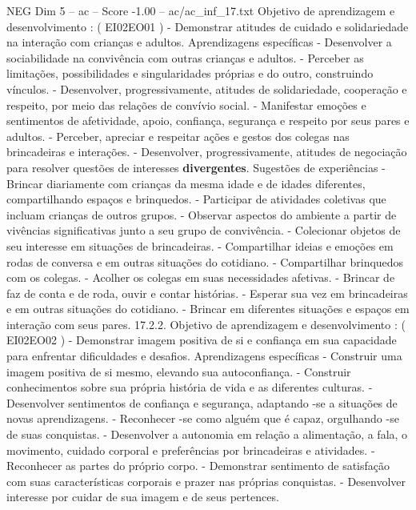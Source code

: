 \begin{textsample}{NEG Dim 5 – ac – Score -1.00 – ac/ac\_inf\_17.txt}
Objetivo de aprendizagem e desenvolvimento : ( EI02EO01 ) - Demonstrar atitudes de cuidado e solidariedade na interação com crianças e adultos.
Aprendizagens específicas - Desenvolver a sociabilidade na convivência com outras crianças e adultos. - Perceber as limitações, possibilidades e singularidades próprias e do outro, construindo vínculos. - Desenvolver, progressivamente, atitudes de solidariedade, cooperação e respeito, por meio das relações de convívio social. - Manifestar emoções e sentimentos de afetividade, apoio, confiança, segurança e respeito por seus pares e adultos. - Perceber, apreciar e respeitar ações e gestos dos colegas nas brincadeiras e interações. - Desenvolver, progressivamente, atitudes de negociação para resolver questões de interesses \textbf{divergentes}.
Sugestões de experiências - Brincar diariamente com crianças da mesma idade e de idades diferentes, compartilhando espaços e brinquedos. - Participar de atividades coletivas que incluam crianças de outros grupos. - Observar aspectos do ambiente a partir de vivências significativas junto a seu grupo de convivência. - Colecionar objetos de seu interesse em situações de brincadeiras. - Compartilhar ideias e emoções em rodas de conversa e em outras situações do cotidiano. - Compartilhar brinquedos com os colegas. - Acolher os colegas em suas necessidades afetivas. - Brincar de faz de conta e de roda, ouvir e contar histórias. - Esperar sua vez em brincadeiras e em outras situações do cotidiano. - Brincar em diferentes situações e espaços em interação com seus pares. 17.2.2.
Objetivo de aprendizagem e desenvolvimento : ( EI02EO02 ) - Demonstrar imagem positiva de si e confiança em sua capacidade para enfrentar dificuldades e desafios.
Aprendizagens específicas - Construir uma imagem positiva de si mesmo, elevando sua autoconfiança. - Construir conhecimentos sobre sua própria história de vida e as diferentes culturas. - Desenvolver sentimentos de confiança e segurança, adaptando -se a situações de novas aprendizagens. - Reconhecer -se como alguém que é capaz, orgulhando -se de suas conquistas. - Desenvolver a autonomia em relação a alimentação, a fala, o movimento, cuidado corporal e preferências por brincadeiras e atividades. - Reconhecer as partes do próprio corpo. - Demonstrar sentimento de satisfação com suas características corporais e prazer nas próprias conquistas. - Desenvolver interesse por cuidar de sua imagem e de seus pertences.

\end{textsample}
